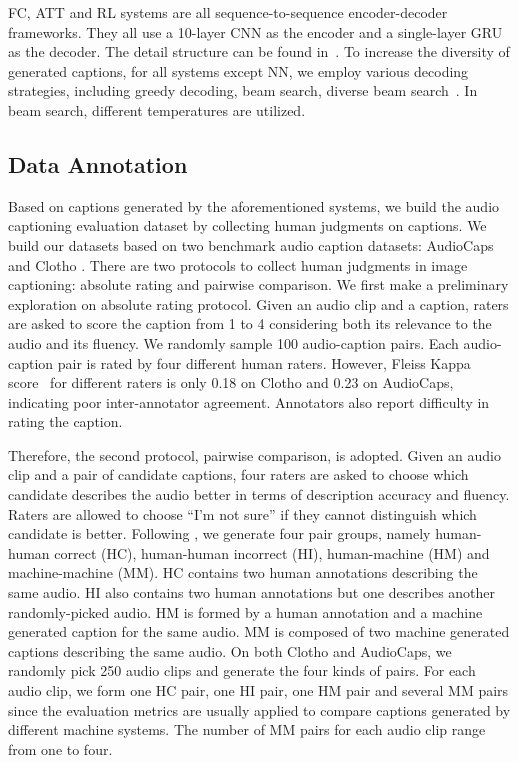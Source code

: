\documentclass{article}
\begin{document}
FC, ATT and RL systems are all sequence-to-sequence encoder-decoder frameworks.
They all use a 10-layer CNN as the encoder and a single-layer GRU as the decoder.
The detail structure can be found in~\cite{xu2021investigating}.
To increase the diversity of generated captions, for all systems except NN, we employ various decoding strategies, including greedy decoding, beam search, diverse beam search~\cite{vijayakumar2018diverse}.
In beam search, different temperatures are utilized.


\subsection{Data Annotation}
\label{ssec:data_annotation}
Based on captions generated by the aforementioned systems, we build the audio captioning evaluation dataset by collecting human judgments on captions.
We build our datasets based on two benchmark audio caption datasets: AudioCaps \cite{kim2019audiocaps} and Clotho \cite{drossos2020clotho}.
There are two protocols to collect human judgments in image captioning: absolute rating and pairwise comparison.
We first make a preliminary exploration on absolute rating protocol.
Given an audio clip and a caption, raters are asked to score the caption from 1 to 4 considering both its relevance to the audio and its fluency.
We randomly sample 100 audio-caption pairs.
Each audio-caption pair is rated by four different human raters.
However, Fleiss Kappa score~\cite{fleiss1971measuring} for different raters is only 0.18 on Clotho and 0.23 on AudioCaps, indicating poor inter-annotator agreement.
Annotators also report difficulty in rating the caption. %

Therefore, the second protocol, pairwise comparison, is adopted.
Given an audio clip and a pair of candidate captions, four raters are asked to choose which candidate describes the audio better in terms of description accuracy and fluency.
Raters are allowed to choose ``I'm not sure'' if they cannot distinguish which candidate is better.
Following \cite{vedantam2015cider}, we generate four pair groups, namely human-human correct (HC), human-human incorrect (HI), human-machine (HM) and machine-machine (MM).
HC contains two human annotations describing the same audio.
HI also contains two human annotations but one describes another randomly-picked audio.
HM is formed by a human annotation and a machine generated caption for the same audio.
MM is composed of two machine generated captions describing the same audio.
On both Clotho and AudioCaps, we randomly pick 250 audio clips and generate the four kinds of pairs.
For each audio clip, we form one HC pair, one HI pair, one HM pair and several MM pairs since the evaluation metrics are usually applied to compare captions generated by different machine systems.
The number of MM pairs for each audio clip range from one to four.
\end{document}
